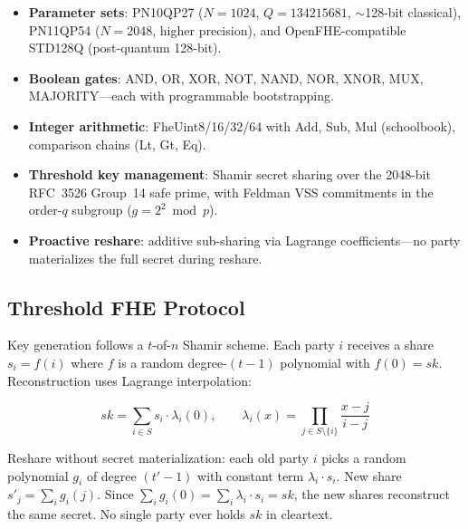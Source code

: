 \begin{itemize}[nosep]
  \item \textbf{Parameter sets}: PN10QP27 ($N{=}1024$, $Q{=}134215681$,
        $\sim$128-bit classical), PN11QP54 ($N{=}2048$, higher precision),
        and OpenFHE-compatible STD128Q (post-quantum 128-bit).
  \item \textbf{Boolean gates}: AND, OR, XOR, NOT, NAND, NOR, XNOR,
        MUX, MAJORITY---each with programmable bootstrapping.
  \item \textbf{Integer arithmetic}: FheUint8/16/32/64 with
        Add, Sub, Mul (schoolbook), comparison chains (Lt, Gt, Eq).
  \item \textbf{Threshold key management}: Shamir secret sharing over
        the 2048-bit RFC~3526 Group~14 safe prime, with Feldman VSS
        commitments in the order-$q$ subgroup ($g = 2^2 \bmod p$).
  \item \textbf{Proactive reshare}: additive sub-sharing via Lagrange
        coefficients---no party materializes the full secret during
        reshare.
\end{itemize}

\subsection{Threshold FHE Protocol}

Key generation follows a $t$-of-$n$ Shamir scheme. Each party $i$
receives a share $s_i = f(i)$ where $f$ is a random degree-$(t{-}1)$
polynomial with $f(0) = \mathit{sk}$. Reconstruction uses Lagrange
interpolation:

\[
\mathit{sk} = \sum_{i \in S} s_i \cdot \lambda_i(0),
\qquad
\lambda_i(x) = \prod_{j \in S \setminus \{i\}} \frac{x - j}{i - j}
\]

Reshare without secret materialization: each old party $i$ picks a
random polynomial $g_i$ of degree $(t'{-}1)$ with constant term
$\lambda_i \cdot s_i$. New share $s'_j = \sum_i g_i(j)$. Since
$\sum_i g_i(0) = \sum_i \lambda_i \cdot s_i = \mathit{sk}$, the new
shares reconstruct the same secret. No single party ever holds
$\mathit{sk}$ in cleartext.

